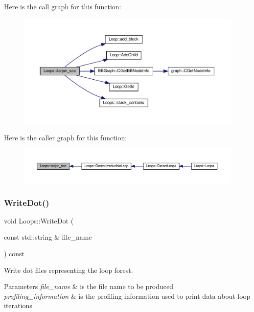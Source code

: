 Here is the call graph for this function\+:
\nopagebreak
\begin{figure}[H]
\begin{center}
\leavevmode
\includegraphics[width=350pt]{d3/ded/classLoops_ae9b35d5e7f808751d95c7dc05e18c7a4_cgraph}
\end{center}
\end{figure}
Here is the caller graph for this function\+:
\nopagebreak
\begin{figure}[H]
\begin{center}
\leavevmode
\includegraphics[width=350pt]{d3/ded/classLoops_ae9b35d5e7f808751d95c7dc05e18c7a4_icgraph}
\end{center}
\end{figure}
\mbox{\label{classLoops_a52664116b60c75c5a56eaf38317e0d94}} 
\subsubsection{\texorpdfstring{Write\+Dot()}{WriteDot()}}
{\footnotesize\ttfamily void Loops\+::\+Write\+Dot (\begin{DoxyParamCaption}\item[{const std\+::string \&}]{file\+\_\+name }\end{DoxyParamCaption}) const}



Write dot files representing the loop forest. 


\begin{DoxyParams}{Parameters}
{\em file\+\_\+name} & is the file name to be produced \\
\hline
{\em profiling\+\_\+information} & is the profiling information used to print data about loop iterations \\
\hline
\end{DoxyParams}


